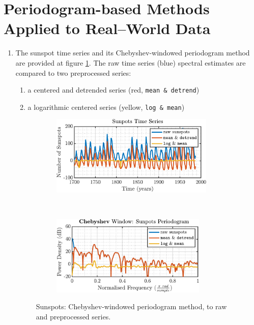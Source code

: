 \section{Periodogram-based Methods Applied to Real–World Data}

\begin{enumerate}[label=\alph*), leftmargin=*]
\item
%

The sunspot time series and its Chebyshev-windowed periodogram method are provided at figure \ref{fig:1_4_a}.
The raw time series (blue) spectral estimates are compared to two preprocessed series:
\begin{enumerate}
    \item a centered and detrended series (red, \texttt{mean \& detrend})
    \item a logarithmic centered series (yellow, \texttt{log \& mean})
\end{enumerate}

\begin{figure}[h]
    \centering
    \begin{subfigure}{0.49\textwidth}
        \centering
        \includegraphics[height=1.5in]{report/spectrum-estimation/periodogram-based-methods-applied-to-real-world-data/assets/a/sunspots-raw}
    \end{subfigure}
    ~ 
    \begin{subfigure}{0.49\textwidth}
        \centering
        \includegraphics[height=1.5in]{report/spectrum-estimation/periodogram-based-methods-applied-to-real-world-data/assets/a/sunspots-Chebyshev}
    \end{subfigure}
    \caption{Sunspots: Chebyshev-windowed periodogram method, to raw and preprocessed series.}
    \label{fig:1_4_a}
\end{figure}


\end{enumerate}
